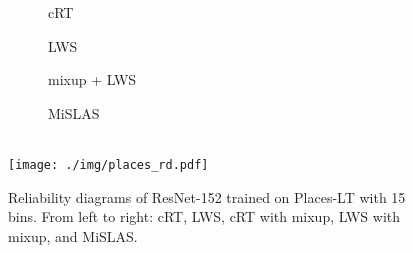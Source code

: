 \documentclass[final]{cvpr}
\begin{document}
	\begin{figure}[h]
		\begin{subfigure}{0.195\linewidth}
			\begin{center}
				{\quad \quad cRT}
			\end{center}
		\end{subfigure}
		\hfill
		\begin{subfigure}{0.195\linewidth}
			\centering
			{\quad   \hspace{1.5pt}  LWS}
		\end{subfigure}
		\hfill
		\begin{subfigure}{0.195\linewidth}
			\centering
			{}
		\end{subfigure} 
		\hfill
		\begin{subfigure}{0.195\linewidth}
			\centering
			{\quad \hspace{-5pt}  mixup + LWS}
		\end{subfigure} 
		\hfill
		\begin{subfigure}{0.195\linewidth}
			\centering
			{MiSLAS}
		\end{subfigure}\\
		\centering
		\texttt{[image: ./img/places\_rd.pdf]} \\
		\vspace{-5pt}
		\caption{Reliability diagrams of ResNet-152 trained on Places-LT with 15 bins. From left to right: cRT, LWS, cRT with mixup, LWS with mixup, and MiSLAS.} 
		\vspace{-10pt}
		\label{fig:more_rd_place}
	\end{figure}
	
\end{document}
